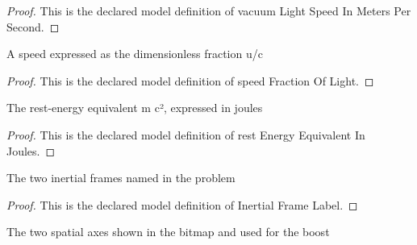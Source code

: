 \begin{proof}
  This is the declared model definition of vacuum Light Speed In Meters Per Second.
\end{proof}
\begin{definition}
  \label{def:physics:phyx-mini-0560:phyxminiproblems-problemphyxmini0560-speedfractionoflight}
  A speed expressed as the dimensionless fraction u/c
\end{definition}
\begin{proof}
  This is the declared model definition of speed Fraction Of Light.
\end{proof}
\begin{definition}
  \label{def:physics:phyx-mini-0560:phyxminiproblems-problemphyxmini0560-restenergyequivalentinjoules}
  The rest-energy equivalent m c², expressed in joules
\end{definition}
\begin{proof}
  This is the declared model definition of rest Energy Equivalent In Joules.
\end{proof}
\begin{definition}
  \label{def:physics:phyx-mini-0560:phyxminiproblems-problemphyxmini0560-inertialframelabel}
  The two inertial frames named in the problem
\end{definition}
\begin{proof}
  This is the declared model definition of Inertial Frame Label.
\end{proof}
\begin{definition}
  \label{def:physics:phyx-mini-0560:phyxminiproblems-problemphyxmini0560-diagramaxis}
  The two spatial axes shown in the bitmap and used for the boost
\end{definition}
